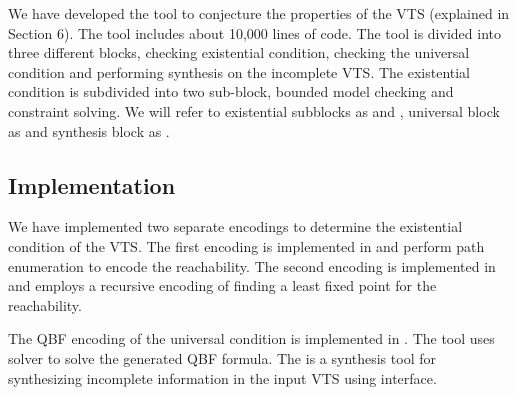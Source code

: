 %

%
We have developed the {\vtstool} tool to conjecture the properties of the VTS (explained in Section 6). 
%
%
The {\vtstool} tool includes about 10,000 lines of code.
%
The tool is divided into three different blocks,
%
checking existential condition, checking the universal condition and performing synthesis on the incomplete VTS. 
%
The existential condition is subdivided into two sub-block, bounded model checking and constraint solving. 
%
We will refer to existential subblocks as {\sattool} and {\smttool}, universal block as {\qbftool} and synthesis block as {\ourtool}.
%


\subsection{Implementation}
We have implemented two separate encodings to determine the existential condition of the VTS. 
%
The first encoding is implemented in {\sattool}
and perform path enumeration to encode the reachability. 
%
%
The second encoding is implemented in {\smttool} and employs a recursive encoding of finding a least fixed point for the reachability. 

%
%
%
The QBF encoding of the universal condition is implemented in {\qbftool}.
%
The tool uses {\depqbf} solver to solve the generated QBF formula. 
%
The {\ourtool} is a synthesis tool for synthesizing incomplete information in the input VTS using {\qbftool} interface.
%

